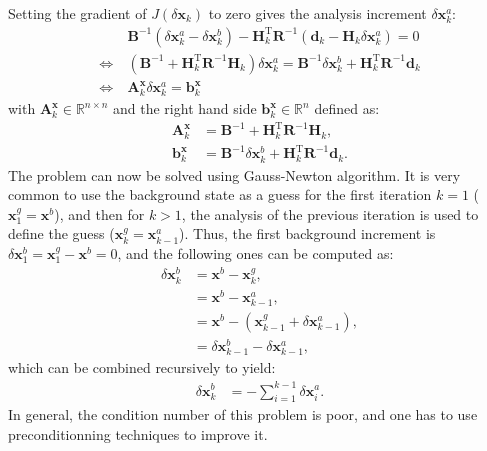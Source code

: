 \documentclass[npg, manuscript]{copernicus}
\begin{document}
Setting the gradient of $J(\delta \mathbf{x}_k)$ to zero gives the analysis increment $\delta \mathbf{x}^a_k$:
\begin{align}
\label{eq:inc}
& \ \mathbf{B}^{-1} \left(\delta \mathbf{x}^a_k - \delta \mathbf{x}^b_k\right) - \mathbf{H}_k^\mathrm{T} \mathbf{R}^{-1} \left(\mathbf{d}_k - \mathbf{H}_k \delta \mathbf{x}^a_k\right) = 0 \nonumber \\
\Leftrightarrow & \ \left(\mathbf{B}^{-1} + \mathbf{H}_k^\mathrm{T} \mathbf{R}^{-1} \mathbf{H}_k\right) \delta \mathbf{x}^a_k = \mathbf{B}^{-1} \delta \mathbf{x}^b_k + \mathbf{H}_k^\mathrm{T} \mathbf{R}^{-1} \mathbf{d}_k \nonumber \\
\Leftrightarrow & \ \boxed{\mathbf{A}^\mathbf{x}_k \delta \mathbf{x}^a_k = \mathbf{b}^\mathbf{x}_k}
\end{align}
with $\mathbf{A}^\mathbf{x}_k \in \mathbb{R}^{n \times n}$ and the right hand side $\mathbf{b}^\mathbf{x}_k \in \mathbb{R}^{n}$ defined as:
\begin{align}
\mathbf{A}^\mathbf{x}_k & = \mathbf{B}^{-1} + \mathbf{H}_k^\mathrm{T} \mathbf{R}^{-1} \mathbf{H}_k , \\
\mathbf{b}^\mathbf{x}_k & = \mathbf{B}^{-1} \delta \mathbf{x}^b_k + \mathbf{H}_k^\mathrm{T} \mathbf{R}^{-1} \mathbf{d}_k .
\end{align}
The problem can now be solved using Gauss-Newton algorithm. It is very common to use the background state as a guess for the first iteration $k=1$ ($\mathbf{x}^g_1 = \mathbf{x}^b$), and then for $k>1$, the analysis of the previous iteration is used to define the guess ($\mathbf{x}^g_k = \mathbf{x}^a_{k-1}$). Thus, the first background increment is $\delta \mathbf{x}^b_1 = \mathbf{x}^g_1 - \mathbf{x}^b = 0$, and the following ones can be computed as:
\begin{align}
\delta \mathbf{x}^b_k & = \mathbf{x}^b - \mathbf{x}^g_k, \nonumber \\
& = \mathbf{x}^b - \mathbf{x}^a_{k-1}, \nonumber \\
& = \mathbf{x}^b - \left(\mathbf{x}^g_{k-1} + \delta \mathbf{x}^a_{k-1}\right), \nonumber \\
& = \delta \mathbf{x}^b_{k-1} - \delta \mathbf{x}^a_{k-1},
\end{align}
which can be combined recursively to yield:
\begin{align}
\label{eq:back_inc}
\delta \mathbf{x}^b_k & = - \sum_{i=1}^{k-1} \delta \mathbf{x}^a_i.
\end{align}
In general, the condition number of this problem is poor, and one has to use preconditionning techniques to improve it.
\end{document}
